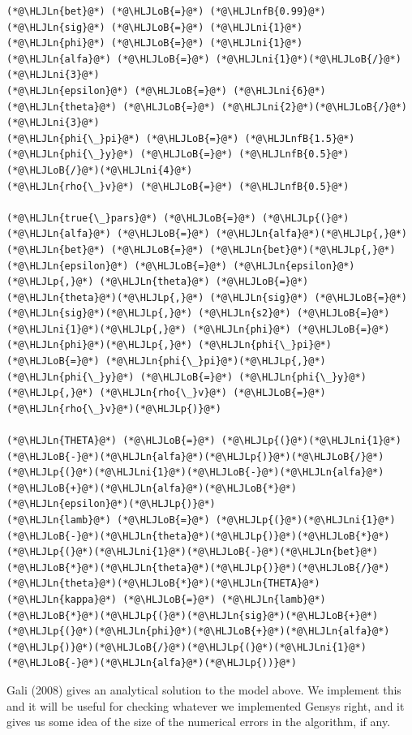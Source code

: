\documentclass[12pt,a4paper]{article}
\newcommand{\HLJLn}[1]{#1}
\newcommand{\HLJLnfB}[1]{\textcolor[RGB]{59,151,46}{#1}}
\newcommand{\HLJLni}[1]{\textcolor[RGB]{59,151,46}{#1}}
\newcommand{\HLJLoB}[1]{\textcolor[RGB]{102,102,102}{\textbf{#1}}}
\newcommand{\HLJLp}[1]{#1}
\begin{document}
\begin{lstlisting}
(*@\HLJLn{bet}@*) (*@\HLJLoB{=}@*) (*@\HLJLnfB{0.99}@*)
(*@\HLJLn{sig}@*) (*@\HLJLoB{=}@*) (*@\HLJLni{1}@*)
(*@\HLJLn{phi}@*) (*@\HLJLoB{=}@*) (*@\HLJLni{1}@*)
(*@\HLJLn{alfa}@*) (*@\HLJLoB{=}@*) (*@\HLJLni{1}@*)(*@\HLJLoB{/}@*)(*@\HLJLni{3}@*)
(*@\HLJLn{epsilon}@*) (*@\HLJLoB{=}@*) (*@\HLJLni{6}@*)
(*@\HLJLn{theta}@*) (*@\HLJLoB{=}@*) (*@\HLJLni{2}@*)(*@\HLJLoB{/}@*)(*@\HLJLni{3}@*)
(*@\HLJLn{phi{\_}pi}@*) (*@\HLJLoB{=}@*) (*@\HLJLnfB{1.5}@*)
(*@\HLJLn{phi{\_}y}@*) (*@\HLJLoB{=}@*) (*@\HLJLnfB{0.5}@*)(*@\HLJLoB{/}@*)(*@\HLJLni{4}@*)
(*@\HLJLn{rho{\_}v}@*) (*@\HLJLoB{=}@*) (*@\HLJLnfB{0.5}@*)

(*@\HLJLn{true{\_}pars}@*) (*@\HLJLoB{=}@*) (*@\HLJLp{(}@*)(*@\HLJLn{alfa}@*) (*@\HLJLoB{=}@*) (*@\HLJLn{alfa}@*)(*@\HLJLp{,}@*) (*@\HLJLn{bet}@*) (*@\HLJLoB{=}@*) (*@\HLJLn{bet}@*)(*@\HLJLp{,}@*) (*@\HLJLn{epsilon}@*) (*@\HLJLoB{=}@*) (*@\HLJLn{epsilon}@*)(*@\HLJLp{,}@*) (*@\HLJLn{theta}@*) (*@\HLJLoB{=}@*) (*@\HLJLn{theta}@*)(*@\HLJLp{,}@*) (*@\HLJLn{sig}@*) (*@\HLJLoB{=}@*) (*@\HLJLn{sig}@*)(*@\HLJLp{,}@*) (*@\HLJLn{s2}@*) (*@\HLJLoB{=}@*) (*@\HLJLni{1}@*)(*@\HLJLp{,}@*) (*@\HLJLn{phi}@*) (*@\HLJLoB{=}@*) (*@\HLJLn{phi}@*)(*@\HLJLp{,}@*) (*@\HLJLn{phi{\_}pi}@*) (*@\HLJLoB{=}@*) (*@\HLJLn{phi{\_}pi}@*)(*@\HLJLp{,}@*) (*@\HLJLn{phi{\_}y}@*) (*@\HLJLoB{=}@*) (*@\HLJLn{phi{\_}y}@*)(*@\HLJLp{,}@*) (*@\HLJLn{rho{\_}v}@*) (*@\HLJLoB{=}@*) (*@\HLJLn{rho{\_}v}@*)(*@\HLJLp{)}@*)

(*@\HLJLn{THETA}@*) (*@\HLJLoB{=}@*) (*@\HLJLp{(}@*)(*@\HLJLni{1}@*)(*@\HLJLoB{-}@*)(*@\HLJLn{alfa}@*)(*@\HLJLp{)}@*)(*@\HLJLoB{/}@*)(*@\HLJLp{(}@*)(*@\HLJLni{1}@*)(*@\HLJLoB{-}@*)(*@\HLJLn{alfa}@*)(*@\HLJLoB{+}@*)(*@\HLJLn{alfa}@*)(*@\HLJLoB{*}@*)(*@\HLJLn{epsilon}@*)(*@\HLJLp{)}@*)
(*@\HLJLn{lamb}@*) (*@\HLJLoB{=}@*) (*@\HLJLp{(}@*)(*@\HLJLni{1}@*)(*@\HLJLoB{-}@*)(*@\HLJLn{theta}@*)(*@\HLJLp{)}@*)(*@\HLJLoB{*}@*)(*@\HLJLp{(}@*)(*@\HLJLni{1}@*)(*@\HLJLoB{-}@*)(*@\HLJLn{bet}@*)(*@\HLJLoB{*}@*)(*@\HLJLn{theta}@*)(*@\HLJLp{)}@*)(*@\HLJLoB{/}@*)(*@\HLJLn{theta}@*)(*@\HLJLoB{*}@*)(*@\HLJLn{THETA}@*)
(*@\HLJLn{kappa}@*) (*@\HLJLoB{=}@*) (*@\HLJLn{lamb}@*)(*@\HLJLoB{*}@*)(*@\HLJLp{(}@*)(*@\HLJLn{sig}@*)(*@\HLJLoB{+}@*)(*@\HLJLp{(}@*)(*@\HLJLn{phi}@*)(*@\HLJLoB{+}@*)(*@\HLJLn{alfa}@*)(*@\HLJLp{)}@*)(*@\HLJLoB{/}@*)(*@\HLJLp{(}@*)(*@\HLJLni{1}@*)(*@\HLJLoB{-}@*)(*@\HLJLn{alfa}@*)(*@\HLJLp{))}@*)
\end{lstlisting}


Gali (2008) gives an analytical solution to the model above. We implement this and it will be useful for checking whatever we implemented Gensys right, and it gives us some idea of the size of the numerical errors in the algorithm, if any.
\end{document}
